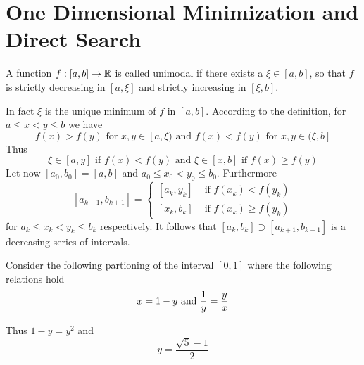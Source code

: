 
\newpage
\section{One Dimensional Minimization and Direct Search}


\label{def:unimodal_fnc}
A function \( f : [a,b] \to \mathbb{R} \) is called unimodal if there exists a \( \xi \in [a,b] \), so that
\( f \) is strictly decreasing in \( [a, \xi] \) and strictly increasing in \( [\xi, b] \).
\bigskip

In fact \( \xi \) is the unique minimum of \( f \) in \( [a, b] \). According to the definition, 
for \( a \le x < y \le b \) we have 
\[
    f(x) > f(y) \text{ for } x, y \in [a, \xi) \text{ and } f(x) < f(y) \text{ for }  x, y \in (\xi, b]
\]
Thus
\[
    \xi \in [a, y] \text{ if } f(x) < f(y) \text{ and } \xi \in [x, b] \text{ if } f(x) \ge f(y)
\]
Let now \( [a_0, b_0] = [a, b] \) and \(a_0 \le x_0 < y_0 \le b_0 \). Furthermore
\[
    [a_{k + 1}, b_{k + 1}] = 
        \begin{cases}
            [a_k, y_k] & \text{ if } f(x_k) < f(y_k)  \\
            [x_k, b_k] & \text{ if } f(x_k) \ge f(y_k)
        \end{cases}
\]
for \( a_k \le x_k < y_k \le b_k \) respectively. It follows that \( [a_k, b_k] \supset [a_{k + 1}, b_{k + 1}] \) 
is a decreasing series of intervals.

Consider the following partioning of the interval \( [0, 1] \) where the following relations hold 
\[
     x = 1 - y \text{ and } \\ \frac{1}{y} = \frac{y}{x}
\]

Thus \( 1 - y = y^2 \) and
\[ 
     y = \frac{\sqrt{5} - 1}{2}
\]
\bigskip

\label{algo:golden_section_search}\hfill
\bigskip
\inputminted{python}{golden_section.py}
\bigskip
